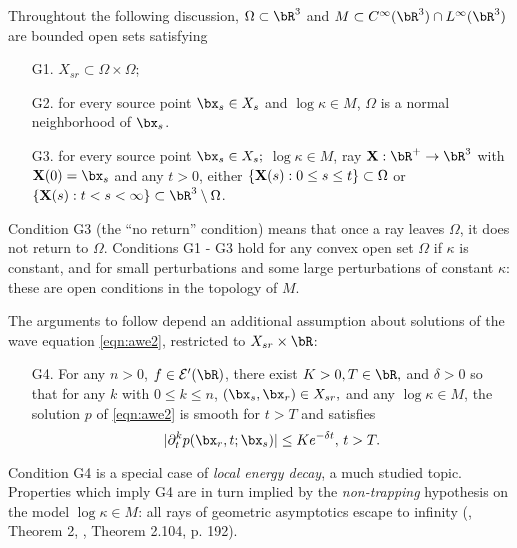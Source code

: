 Throughtout the following discussion, $\Omega\subset \bR^3$ 
and $M \subset C^{\infty}(\bR^3) \cap L^{\infty}(\bR^3)$ are bounded open sets satisfying 
\begin{itemize}
  \item[G1. ] $X_{sr} \subset \Omega \times \Omega$;
  \item[G2. ] for every source point $\bx_s\in X_{s}$ and $\log \kappa \in M$, $\Omega$ is a
    normal neighborhood of $\bx_s$.
  \item[G3. ] for every source point $\bx_s \in X_{s};$
    $\log \kappa \in M$, ray ${\bf X}:\bR^+\rightarrow \bR^3$
    with ${\bf X}(0)=\bx_s$ and any $t>0$, either $\{{\bf X}(s): 0\le s \le t\} \subset \Omega$
    or $\{{\bf X}(s): t < s < \infty\} \subset \bR^3 \setminus \Omega$.
  \end{itemize}
Condition G3 (the ``no return'' condition) means that once a ray
leaves $\Omega$, it does not return to $\Omega$. Conditions G1 - G3
hold for any convex open set $\Omega$ if $\kappa$ is constant, and for small perturbations and some
large perturbations of constant $\kappa$: these are open conditions in
the topology of $M$.

The arguments to follow depend an additional assumption about solutions of
the wave equation \ref{eqn:awe2}, restricted to $X_{sr}\times \bR$:
\begin{itemize}
\item[G4. ] For any $n > 0$, $f \in {\cal E}'(\bR)$, there exist $K >
  0, T \in \bR,$ and $\delta>0$ so
  that for any $k$ with $0 \le k \le n$, $(\bx_s,\bx_r) \in
 X_{sr},$
  and any $\log \kappa \in M$, the solution $p$ of \ref{eqn:awe2} is smooth
  for $t>T$ and satisfies
  \[
    |\partial_t^k p(\bx_r,t;\bx_s)| \le K e^{-\delta t}, \, t > T.
  \]
\end{itemize}
Condition G4 is a special case of {\em local energy decay}, a much
studied topic. Properties which imply G4 are in turn implied by the
{\em non-trapping} hypothesis on the model $\log \kappa \in M$: all rays of
geometric asymptotics escape to infinity (\cite{Hristova:09}, Theorem
2, \cite{EgorovShubin}, Theorem 2.104, p. 192).

